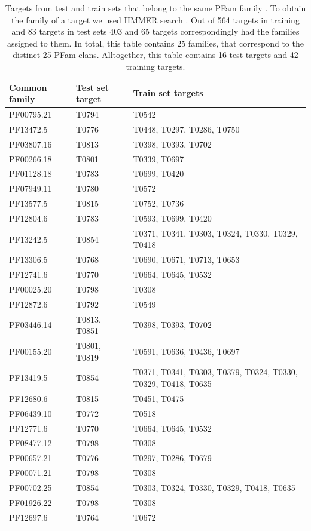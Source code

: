 \begin{table}[H]
\begin{center}
\begin{tabular}{ l | l | l }

    Common family & Test set target & Train set targets \\
    \hline
    PF00795.21 & T0794 & T0542 \\ \hline
    PF13472.5 & T0776 & T0448, T0297, T0286, T0750 \\ \hline
    PF03807.16 & T0813 & T0398, T0393, T0702 \\ \hline
    PF00266.18 & T0801 & T0339, T0697 \\ \hline
    PF01128.18 & T0783 & T0699, T0420 \\ \hline
    PF07949.11 & T0780 & T0572 \\ \hline
    PF13577.5 & T0815 & T0752, T0736 \\ \hline
    PF12804.6 & T0783 & T0593, T0699, T0420 \\ \hline
    PF13242.5 & T0854 & T0371, T0341, T0303, T0324, T0330, T0329, T0418 \\ \hline
    PF13306.5 & T0768 & T0690, T0671, T0713, T0653 \\ \hline
    PF12741.6 & T0770 & T0664, T0645, T0532 \\ \hline
    PF00025.20 & T0798 & T0308 \\ \hline
    PF12872.6 & T0792 & T0549 \\ \hline
    PF03446.14 & T0813, T0851 & T0398, T0393, T0702 \\ \hline
    PF00155.20 & T0801, T0819 & T0591, T0636, T0436, T0697 \\ \hline
    PF13419.5 & T0854 & T0371, T0341, T0303, T0379, T0324, T0330, T0329, T0418, T0635 \\ \hline
    PF12680.6 & T0815 & T0451, T0475 \\ \hline
    PF06439.10 & T0772 & T0518 \\ \hline
    PF12771.6 & T0770 & T0664, T0645, T0532 \\ \hline
    PF08477.12 & T0798 & T0308 \\ \hline
    PF00657.21 & T0776 & T0297, T0286, T0679 \\ \hline
    PF00071.21 & T0798 & T0308 \\ \hline
    PF00702.25 & T0854 & T0303, T0324, T0330, T0329, T0418, T0635 \\ \hline
    PF01926.22 & T0798 & T0308 \\ \hline
    PF12697.6 & T0764 & T0672 \\ \hline
\end{tabular}
    
\caption {Targets from test and train sets that belong to the same PFam family \cite{}. To obtain the family of a target we used HMMER search \cite{}.
Out of 564 targets in training and 83 targets in test sets 403 and 65 targets correspondingly had the families assigned to them. In total, this 
table contains 25 families, that correspond to the distinct 25 PFam clans. Alltogether, this table contains 16 test targets and 42 training targets.}
\label{Tbl:SharedPFam}
\end{center}
\end{table}

